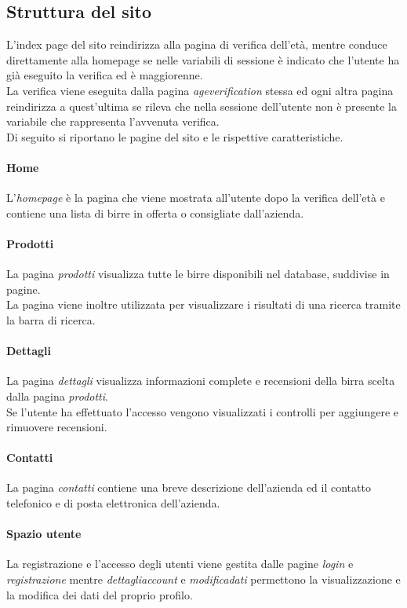 \subsection{Struttura del sito}
L'index page del sito reindirizza alla pagina di verifica dell'età, mentre conduce direttamente alla homepage se nelle variabili di sessione è indicato che l'utente ha già eseguito la verifica ed è maggiorenne.\\
La verifica viene eseguita dalla pagina \textit{ageverification} stessa ed ogni altra pagina reindirizza a quest'ultima se rileva che nella sessione dell'utente non è presente la variabile che rappresenta l'avvenuta verifica.\\
Di seguito si riportano le pagine del sito e le rispettive caratteristiche.

\paragraph{Home}
L'\textit{homepage} è la pagina che viene mostrata all'utente dopo la verifica dell'età e contiene una lista di birre in offerta o consigliate dall'azienda.

\paragraph{Prodotti}
La pagina \textit{prodotti} visualizza tutte le birre disponibili nel database, suddivise in pagine.\\
La pagina viene inoltre utilizzata per visualizzare i risultati di una ricerca tramite la barra di ricerca.

\paragraph{Dettagli}
La pagina \textit{dettagli} visualizza informazioni complete e recensioni della birra scelta dalla pagina \textit{prodotti}.\\
Se l'utente ha effettuato l'accesso vengono visualizzati i controlli per aggiungere e rimuovere recensioni.

\paragraph{Contatti}
La pagina \textit{contatti} contiene una breve descrizione dell'azienda ed il contatto telefonico e di posta elettronica dell'azienda.

\paragraph{Spazio utente}
La registrazione e l'accesso degli utenti viene gestita dalle pagine \textit{login} e \textit{registrazione} mentre \textit{dettagliaccount} e \textit{modificadati} permettono la visualizzazione e la modifica dei dati del proprio profilo.

